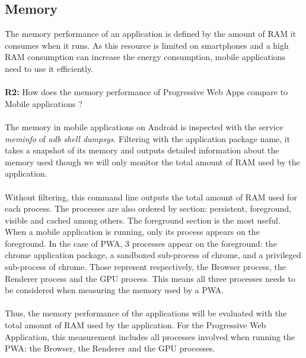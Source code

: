 \subsection{Memory}

The memory performance of an application is defined by the amount of RAM it consumes when it runs. As this resource is limited on smartphones and a high RAM consumption can increase the energy consumption, mobile applications need to use it efficiently. 
\paragraph{}
\textbf{R2:} How does the memory performance of Progressive Web Apps compare to Mobile applications ?

\paragraph{}
The memory in mobile applications on Android is inspected with the service \textit{meminfo} of \textit{adb shell dumpsys}. Filtering with the application package name, it takes a snapshot of its memory and outputs detailed information about the memory used though we will only monitor the total amount of RAM used by the application.

\paragraph{}
Without filtering, this command line outputs the total amount of RAM used for each process. The processes are also ordered by section: persistent, foreground, visible and cached among others. \newline
The foreground section is the most useful. When a mobile application is running, only its process appears on the foreground. In the case of PWA, 3 processes appear on the foreground: the chrome application package, a sandboxed sub-process of chrome, and a privileged sub-process of chrome. Those represent respectively, the Browser process, the Renderer process and the GPU process. This means all three processes needs to be considered when measuring the memory used by a PWA. 

\paragraph{}
Thus, the memory performance of the applications will be evaluated with the total amount of RAM used by the application. For the Progressive Web Application, this measurement includes all processes involved when running the PWA: the Browser, the Renderer and the GPU processes. 
    
